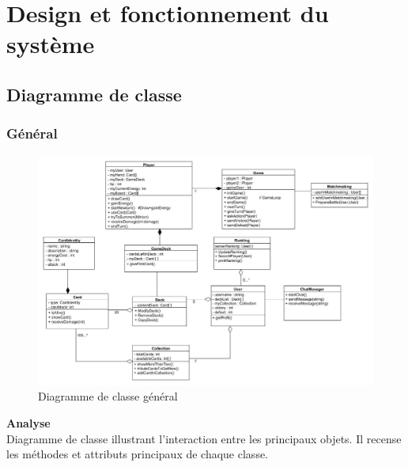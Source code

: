\section{Design et fonctionnement du système}
\subsection{Diagramme de classe}
\subsubsection{Général}
{
\begin{figure}[H]
    \includegraphics[width=1\textwidth,height=1\textwidth]{Images/classDiagram.jpg}
    \caption{\label{Class Diagram Partie}Diagramme de classe général}
\end{figure}
\noindent\textbf{Analyse}\\
Diagramme de classe illustrant l'interaction entre les principaux objets. Il recense les méthodes et attributs 
principaux de chaque classe.
}
